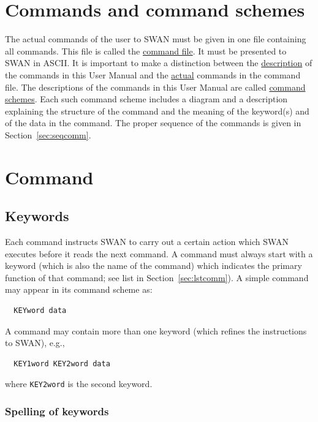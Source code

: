 \documentclass[12pt]{book}
\begin{document}
 \label{app:syntax}

\section{Commands and command schemes}

The actual commands of the user to SWAN must be given in one file containing all commands. This file is called the
\underline{command file}. It must be presented to SWAN in ASCII. It is important to make a distinction between the
\underline{description} of the commands in this User Manual and the \underline{actual} commands in the command file.
The descriptions of the commands in this User Manual are called \underline{command schemes}. Each such command scheme
includes a diagram and a description explaining the structure of the command and the meaning of the keyword(s) and
of the data in the command.  The proper sequence of the commands is given in Section~\ref{sec:seqcomm}.

\section{Command}

\subsection{Keywords}

Each command instructs SWAN to carry out a certain action which SWAN executes before it reads the next command.
A command must always start with a keyword (which is also the name of the command) which indicates the primary
function of that command; see list in Section~\ref{sec:lstcomm}). A simple command may appear in its command
scheme as:
\begin{verbatim}
  KEYword data
\end{verbatim}
A command may contain more than one keyword (which refines the instructions to SWAN), e.g.,
\begin{verbatim}
  KEY1word KEY2word data
\end{verbatim}
where {\tt KEY2word} is the second keyword.

\subsubsection{Spelling of keywords}
\end{document}
